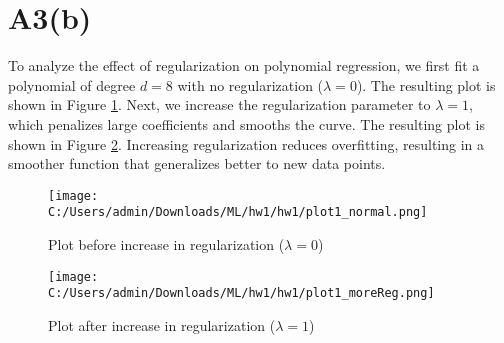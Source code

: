 \documentclass{article}
\begin{document}
\section*{A3(b)}

To analyze the effect of regularization on polynomial regression, we first fit a polynomial of degree \( d = 8 \) with no regularization (\( \lambda = 0 \)). The resulting plot is shown in Figure \ref{fig:before_reg}. Next, we increase the regularization parameter to \( \lambda = 1 \), which penalizes large coefficients and smooths the curve. The resulting plot is shown in Figure \ref{fig:after_reg}. Increasing regularization reduces overfitting, resulting in a smoother function that generalizes better to new data points.

\begin{figure}
    \centering
    \texttt{[image: C:/Users/admin/Downloads/ML/hw1/hw1/plot1\_normal.png]}
    \caption{Plot before increase in regularization (\( \lambda = 0 \))}
    \label{fig:before_reg}
\end{figure}

\begin{figure}
    \centering
    \texttt{[image: C:/Users/admin/Downloads/ML/hw1/hw1/plot1\_moreReg.png]}
    \caption{Plot after increase in regularization (\( \lambda = 1 \))}
    \label{fig:after_reg}
\end{figure}
\end{document}
